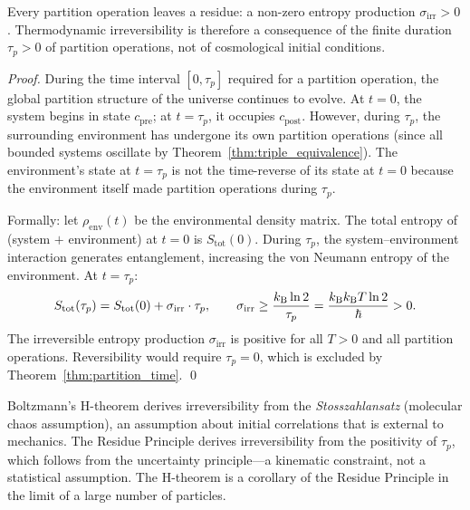 \begin{corollary}
\label{cor:residue_principle}
Every partition operation leaves a residue: a non-zero entropy production
$\sigma_{\mathrm{irr}} > 0$. Thermodynamic irreversibility is therefore a
consequence of the finite duration $\tau_p > 0$ of partition operations,
not of cosmological initial conditions.
\end{corollary}

\begin{proof}
During the time interval $[0, \tau_p]$ required for a partition operation,
the global partition structure of the universe continues to evolve. At $t = 0$,
the system begins in state $c_{\mathrm{pre}}$; at $t = \tau_p$, it occupies
$c_{\mathrm{post}}$. However, during $\tau_p$, the surrounding environment
has undergone its own partition operations (since all bounded systems oscillate
by Theorem~\ref{thm:triple_equivalence}). The environment's state at $t = \tau_p$
is not the time-reverse of its state at $t = 0$ because the environment itself
made partition operations during $\tau_p$.

Formally: let $\rho_{\mathrm{env}}(t)$ be the environmental density matrix.
The total entropy of (system $+$ environment) at $t = 0$ is $S_{\mathrm{tot}}(0)$.
During $\tau_p$, the system--environment interaction generates entanglement,
increasing the von Neumann entropy of the environment. At $t = \tau_p$:
\begin{equation}
  S_{\mathrm{tot}}(\tau_p) = S_{\mathrm{tot}}(0) + \sigma_{\mathrm{irr}} \cdot \tau_p,
  \qquad \sigma_{\mathrm{irr}} \geq \frac{k_{\mathrm{B}} \ln 2}{\tau_p} = \frac{k_{\mathrm{B}} k_{\mathrm{B}} T \ln 2}{\hbar} > 0.
\end{equation}
The irreversible entropy production $\sigma_{\mathrm{irr}}$ is positive for
all $T > 0$ and all partition operations. Reversibility would require
$\tau_p = 0$, which is excluded by Theorem~\ref{thm:partition_time}. \qed
\end{proof}

\begin{remark}
Boltzmann's H-theorem derives irreversibility from the \emph{Stosszahlansatz}
(molecular chaos assumption), an assumption about initial correlations that
is external to mechanics. The Residue Principle derives irreversibility from
the positivity of $\tau_p$, which follows from the uncertainty principle---a
kinematic constraint, not a statistical assumption. The H-theorem is a corollary
of the Residue Principle in the limit of a large number of particles.
\end{remark}

